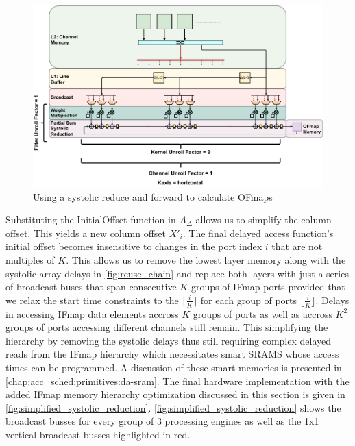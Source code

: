 \begin{figure}[]
    \centering
    \includegraphics[scale=0.36]{fig/hybrid3x3Gemm.pdf}
    \caption{Using a systolic reduce and forward to calculate OFmaps}
    \label{fig:simplified_systolic_reduction}
\end{figure}

Substituting the InitialOffset function in $A_\Delta$  allows us to simplify the
column offset. This yields a new column offset $X'_i$. The final delayed access
function's initial offset becomes insensitive to changes in the port index $i$
that are not multiples of $K$. This allows us to remove the lowest layer memory
along with the systolic array delays in \autoref{fig:reuse_chain} and replace
both layers with just a series of broadcast buses that span consecutive $K$
groups of IFmap ports provided that we relax the start time constraints to the
$\lceil \frac{i}{K} \rceil$ for each group of ports $\lfloor \frac{i}{K}
\rfloor$. Delays in accessing IFmap data elements accross $K$ groups of ports
as well as accross $K^2$ groups of ports accessing different channels still
remain. This simplifying the hierarchy by removing the systolic delays thus still
requiring complex delayed reads from the IFmap hierarchy which necessitates smart
SRAMS whose access times can be programmed. A discussion of these smart memories
is presented in \autoref{chap:acc_sched:primitives:da-sram}. The final
hardware implementation with the added IFmap memory hierarchy optimization
discussed in this section is given in
\autoref{fig:simplified_systolic_reduction}.
\autoref{fig:simplified_systolic_reduction} shows the broadcast busses for every
group of 3 processing engines as well as the 1x1 vertical broadcast busses
highlighted in red. 


